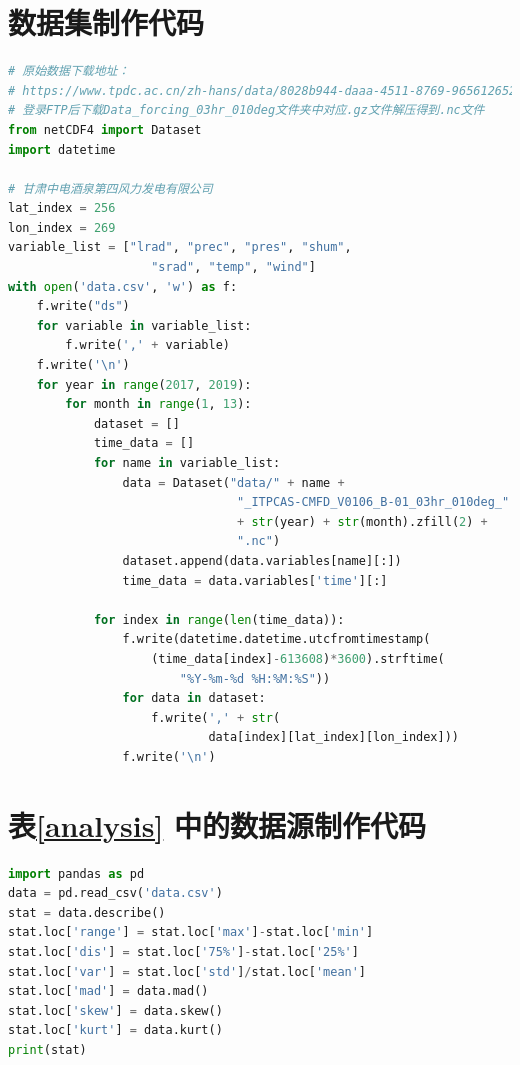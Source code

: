 \documentclass[AutoFakeBold]{LZUThesis}
\begin{document}
\backmatter


\printbib


\Appendix

\section{数据集制作代码}

\begin{lstlisting}[language = python]
# 原始数据下载地址：
# https://www.tpdc.ac.cn/zh-hans/data/8028b944-daaa-4511-8769-965612652c49
# 登录FTP后下载Data_forcing_03hr_010deg文件夹中对应.gz文件解压得到.nc文件
from netCDF4 import Dataset
import datetime

# 甘肃中电酒泉第四风力发电有限公司
lat_index = 256
lon_index = 269
variable_list = ["lrad", "prec", "pres", "shum",
                    "srad", "temp", "wind"]
with open('data.csv', 'w') as f:
    f.write("ds")
    for variable in variable_list:
        f.write(',' + variable)
    f.write('\n')
    for year in range(2017, 2019):
        for month in range(1, 13):
            dataset = []
            time_data = []
            for name in variable_list:
                data = Dataset("data/" + name + 
                                "_ITPCAS-CMFD_V0106_B-01_03hr_010deg_"
                                + str(year) + str(month).zfill(2) +
                                ".nc")
                dataset.append(data.variables[name][:])
                time_data = data.variables['time'][:]

            for index in range(len(time_data)):
                f.write(datetime.datetime.utcfromtimestamp(
                    (time_data[index]-613608)*3600).strftime(
                        "%Y-%m-%d %H:%M:%S"))
                for data in dataset:
                    f.write(',' + str(
                            data[index][lat_index][lon_index]))
                f.write('\n')
\end{lstlisting}

\section{表\ref{analysis} 中的数据源制作代码}

\begin{lstlisting}[language = python]
import pandas as pd
data = pd.read_csv('data.csv')
stat = data.describe()
stat.loc['range'] = stat.loc['max']-stat.loc['min']
stat.loc['dis'] = stat.loc['75%']-stat.loc['25%']
stat.loc['var'] = stat.loc['std']/stat.loc['mean']
stat.loc['mad'] = data.mad()
stat.loc['skew'] = data.skew()
stat.loc['kurt'] = data.kurt()
print(stat)
\end{lstlisting}
\end{document}
